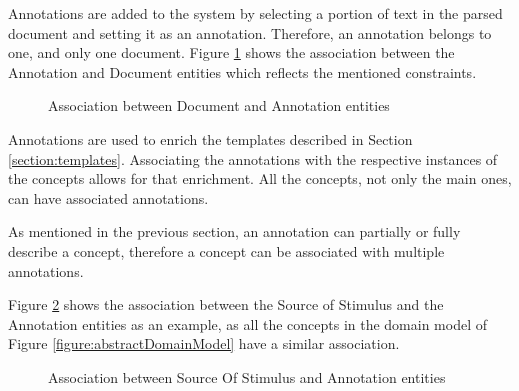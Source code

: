 Annotations are added to the system by selecting a portion of text in the parsed document and setting it as an annotation. Therefore, an annotation belongs to one, and only one document. Figure \ref{figure:documentAnnotation} shows the association between the Annotation and Document entities which reflects the mentioned constraints.

\begin{figure}[h]
\centering
\renewcommand {\umltextcolor}{black}
\renewcommand {\umlfillcolor}{none}
\renewcommand {\umldrawcolor}{black}

\caption{Association between Document and Annotation entities}
\label{figure:documentAnnotation}
\end{figure}

Annotations are used to enrich the templates described in Section \ref{section:templates}. Associating the annotations with the respective instances of the concepts allows for that enrichment. All the concepts, not only the main ones, can have associated annotations.

As mentioned in the previous section, an annotation can partially or fully describe a concept, therefore a concept can be associated with multiple annotations. 

Figure \ref{figure:annotationConcept} shows the association between the Source of Stimulus and the Annotation entities as an example, as all the concepts in the domain model of Figure \ref{figure:abstractDomainModel} have a similar association.

\begin{figure}[h]
\centering
\renewcommand {\umltextcolor}{black}
\renewcommand {\umlfillcolor}{none}
\renewcommand {\umldrawcolor}{black}

\caption{Association between Source Of Stimulus and Annotation entities}
\label{figure:annotationConcept}
\end{figure}

